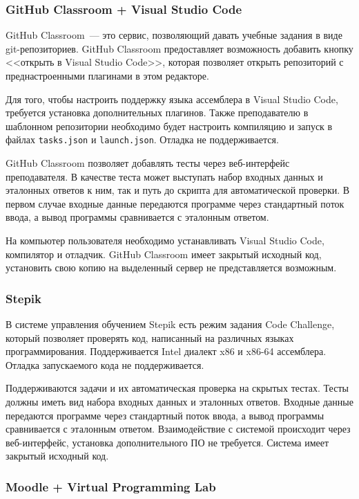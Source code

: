 \documentclass[a4paper,article,14pt]{extarticle}
\begin{document}
\subsubsection{GitHub Classroom + Visual Studio Code}

GitHub Classroom\cite{githubclassroom}~--- это сервис, позволяющий давать учебные задания в виде git-репозиториев. GitHub Classroom предоставляет возможность добавить кнопку <<открыть в Visual Studio Code>>\cite{githubclassroomvscode}, которая позволяет открыть репозиторий с преднастроенными плагинами в этом редакторе.

Для того, чтобы настроить поддержку языка ассемблера в Visual Studio Code, требуется установка дополнительных плагинов. Также преподавателю в шаблонном репозитории необходимо будет настроить компиляцию и запуск в файлах \texttt{tasks.json} и \texttt{launch.json}. Отладка не поддерживается.

GitHub Classroom позволяет добавлять тесты через веб-интерфейс преподавателя. В качестве теста может выступать набор входных данных и эталонных ответов к ним, так и путь до скрипта для автоматической проверки. В первом случае входные данные передаются программе через стандартный поток ввода, а вывод программы сравнивается с эталонным ответом.

На компьютер пользователя необходимо устанавливать Visual Studio Code, компилятор и отладчик. GitHub Classroom имеет закрытый исходный код, установить свою копию на выделенный сервер не представляется возможным.

\subsubsection{Stepik}

В системе управления обучением Stepik\cite{stepik} есть режим задания Code Challenge, который позволяет проверять код, написанный на различных языках программирования. Поддерживается Intel диалект x86 и x86-64 ассемблера. Отладка запускаемого кода не поддерживается.

Поддерживаются задачи и их автоматическая проверка на скрытых тестах. Тесты должны иметь вид набора входных данных и эталонных ответов. Входные данные передаются программе через стандартный поток ввода, а вывод программы сравнивается с эталонным ответом. Взаимодействие с системой происходит через веб-интерфейс, установка дополнительного ПО не требуется. Система имеет закрытый исходный код.

\subsubsection{Moodle + Virtual Programming Lab}
\end{document}
